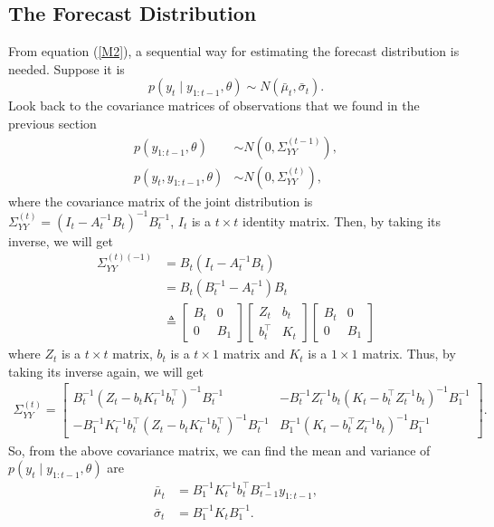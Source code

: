 \subsection{The Forecast Distribution}\label{sectionforecast}

From equation (\ref{M2}), a sequential way for estimating the forecast distribution is needed. Suppose it is 
\begin{equation}
p(y_{t}\mid y_{1:t-1},\theta) \sim N\left( \bar{\mu}_{t},\bar{\sigma}_{t} \right). 
\end{equation}
Look back to the covariance matrices of observations that we found in the previous section 
\begin{align*}
p(y_{1:t-1},\theta) &\sim N\left( 0,\Sigma_{YY}^{(t-1)} \right),\\
p(y_{t},y_{1:t-1},\theta) &\sim N\left( 0,\Sigma_{YY}^{(t)} \right),
\end{align*}
where the covariance matrix of the joint distribution is $\Sigma_{YY}^{(t)} = (I_{t}-A_{t}^{-1}B_{t})^{-1}B_{t}^{-1}$, $I_t$ is a $t\times t$ identity matrix. Then, by taking its inverse, we will get 
\begin{align*}
\Sigma_{YY}^{(t) (-1)} &= B_{t}(I_{t}-A_{t}^{-1}B_{t}) \\
&= B_{t}(B_{t}^{-1}-A_{t}^{-1})B_{t} \\
&\triangleq \begin{bmatrix} 
B_t & 0 \\ 0 & B_1 \end{bmatrix}
\begin{bmatrix} 
Z_{t} & b_{t} \\
b_{t}^\top & K_{t}
\end{bmatrix} \begin{bmatrix} 
B_t & 0 \\ 0 & B_1\end{bmatrix}
\end{align*}
where $Z_{t}$ is a $t \times t$ matrix, $ b_{t} $ is a $t \times 1$ matrix and $K_{t}$ is a $1 \times 1$ matrix. Thus, by taking its inverse again, we will get 
\begin{align*} \Sigma_{YY}^{(t)}= \left[ \begin{matrix}
B_t^{-1} \left(Z_{t}-b_{t}K_{t}^{-1}b_{t}^\top\right)^{-1}B_t^{-1}  & - B_t^{-1}  Z_{t}^{-1}b_{t}\left(K_{t}-b_{t}^\top Z_{t}^{-1}b_{t}\right)^{-1}B_1^{-1} \\
-B_1^{-1}  K_{t}^{-1}b_{t}^\top \left(Z_{t}-b_{t}K_{t}^{-1}b_{t}^\top\right)^{-1}B_t^{-1}  & B_1^{-1}  \left(K_{t}-b_{t}^\top Z_{t}^{-1}b_{t}\right)^{-1}B_1^{-1} 
\end{matrix}\right].
\end{align*}
So, from the above covariance matrix, we can find the mean and variance of $p\left(y_{t}\mid y_{1:t-1},\theta\right)$ are 
\begin{align}
\bar{\mu}_{t} & =  B_1^{-1}K_{t}^{-1}b_{t}^\top B_{t-1}^{-1}y_{1:t-1} ,\\
\bar{\sigma}_{t} & =  B_1^{-1}K_{t}B_1^{-1}  .
\end{align}




